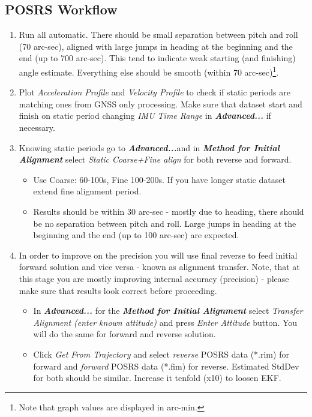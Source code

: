 \documentclass[11pt,fleqn]{book} %
\begin{document}
\subsection{POSRS Workflow\label{sub:POSRS-Workflow}}

\begin{enumerate}
	\item Run all automatic. There should be small separation between pitch and roll (70 arc-sec), aligned with large jumps in heading at the beginning and the end (up to 700 arc-sec). This tend to indicate weak starting (and finishing) angle estimate. Everything else should be smooth (within 70 arc-sec)\footnote{Note that graph values are displayed in arc-min.}.
	\item Plot \emph{Acceleration Profile} and \emph{Velocity Profile} to check if static periods are matching ones from GNSS only processing. Make sure that dataset start and finish on static period changing \textit{IMU Time Range} in \textbf{\emph{Advanced...}} if necessary.
	\item Knowing static periods go to \textbf{\emph{Advanced...}}and in \textbf{\emph{Method for Initial Alignment}} select \emph{Static Coarse+Fine align} for both reverse and forward. 
	\begin{itemize}
		\item Use Coarse: 60-100s, Fine 100-200s. If you have longer static dataset extend fine alignment period. 
		\item Results should be within 30 arc-sec - mostly due to heading, there should be no separation between pitch and roll. Large jumps in heading at the beginning and the end (up to 100 arc-sec) are expected. 
	\end{itemize}
	\item In order to improve on the precision you will use final reverse to feed initial forward solution and vice versa - known as alignment transfer. Note, that at this stage you are mostly improving internal accuracy (precision) - please make sure that results look correct before proceeding.
	\begin{itemize}
		\item In \textbf{\emph{Advanced...}} for the \textbf{\emph{Method for Initial Alignment}} select \emph{Transfer Alignment (enter known attitude) }and press\emph{ Enter Attitude }button. You will do the same for forward and reverse solution.
		\item Click \emph{Get From Trajectory }and select \emph{reverse} POSRS data ({*}.rim) for forward and \emph{forward} POSRS data ({*}.fim) for reverse. Estimated StdDev for both should be similar. Increase it tenfold (x10) to loosen EKF. 

\end{itemize}
\end{enumerate}
\end{document}
